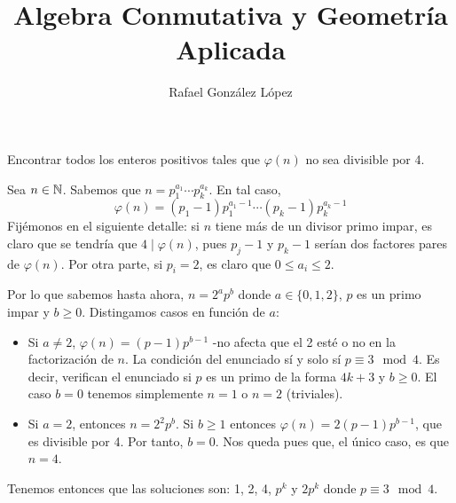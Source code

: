 \documentclass[twoside]{article}
\begin{document}
\title{Algebra Conmutativa y Geometría Aplicada}
\author{Rafael González López}
\maketitle

\begin{ejercicio}{1}
Encontrar todos los enteros positivos tales que $\varphi(n)$ no sea divisible por 4.
\begin{sol}
Sea $n\in \mathbb{N}$. Sabemos que $n=p_1^{a_1}\cdots p_k^{a_k}$. En tal caso, 
\[
\varphi(n) = (p_1-1)p_1^{a_1-1}\cdots(p_k-1)p_k^{a_k-1}
\]
Fijémonos en el siguiente detalle: si $n$ tiene más de un divisor primo impar, es claro que se tendría que $4\mid \varphi(n)$, pues $p_j -1$ y $p_k-1$ serían dos factores pares de $\varphi(n)$. Por otra parte, si $p_i=2$, es claro que $0\leq a_i \leq 2$. 

Por lo que sabemos hasta ahora, $n = 2^a p^b$ donde $a\in\{0,1,2\}$, $p$ es un primo impar y $b\geq 0$. Distingamos casos en función de $a$:
\begin{itemize}
\item Si $a\neq 2$, $\varphi(n) = (p-1)p^{b-1}$ -no afecta que el 2 esté o no en la factorización de $n$. La condición del enunciado sí y solo sí $p \equiv 3 \mod 4$. Es decir, verifican el enunciado si $p$ es un primo de la forma $4k + 3$ y $b\geq 0$. El caso $b=0$ tenemos simplemente $n=1$ o $n=2$ (triviales).
\item Si $a=2$, entonces $n=2^2p^b$. Si $b\geq 1$ entonces $\varphi(n)=2(p-1)p^{b-1}$, que es divisible por 4. Por tanto, $b=0$. Nos queda pues que, el único caso, es que $n=4$.
\end{itemize}
Tenemos entonces que las soluciones son: 1, 2, 4, $p^k$ y $2p^k$ donde $p \equiv 3 \mod 4$.
\end{sol}
\end{ejercicio}

\newpage
\end{document}
